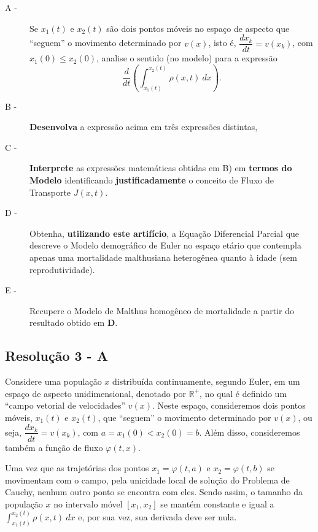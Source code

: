\begin{description}
\item[A -] Se $x_1(t)$ e $x_2(t)$ são dois pontos móveis no espaço de aspecto que ``seguem'' o movimento determinado por $v(x)$, isto é, $\dfrac{dx_k}{dt} = v(x_k)$, com \(x_1(0) \le x_2(0)\), analise o sentido (no modelo) para a expressão
\[\dfrac{d}{dt}\left(\displaystyle\int_{x_1(t)}^{x_2(t)} \rho(x,t)\ dx\right).\]

\item[B -] \textbf{Desenvolva} a expressão acima em três expressões distintas,

\item[C -] \textbf{Interprete} as expressões matemáticas obtidas em B) em \textbf{termos do Modelo} identificando \textbf{justificadamente} o conceito de Fluxo de Transporte \(J(x,t)\).

\item[D -] Obtenha, \textbf{utilizando este artifício}, a Equação Diferencial Parcial que descreve o Modelo demográfico de Euler no espaço etário que contempla apenas uma mortalidade malthusiana heterogênea quanto à idade (sem reprodutividade).

\item[E -] Recupere o Modelo de Malthus homogêneo de mortalidade a partir do resultado obtido em \textbf{D}.
\end{description}


\clearpage

\subsection*{\blue Resolução 3 - \textbf{A}}

Considere uma população $x$ distribuída continuamente, segundo Euler, em um espaço de aspecto unidimensional, denotado por \(\mathbb{R}^+\), no qual é definido um ``campo vetorial de velocidades'' $v(x)$. Neste espaço, consideremos dois pontos móveis, $x_1(t)$ e $x_2(t)$, que ``seguem'' o movimento determinado por $v(x)$, ou seja, $\dfrac{dx_k}{dt} = v(x_k)$, com $a = x_1(0) < x_2(0) = b$. Além disso, consideremos também a função de fluxo $\varphi (t, x)$.

Uma vez que as trajetórias dos pontos \(x_1 = \varphi(t, a)\) e \(x_2 = \varphi(t, b)\) se movimentam com o campo, pela unicidade local de solução do Problema de Cauchy, nenhum outro ponto se encontra com eles. Sendo assim, o tamanho da população $x$ no intervalo móvel \([x_1, x_2]\) se mantém constante e igual a \(\displaystyle\int_{x_1(t)}^{x_2(t)} \rho(x,t)\ dx\) e, por sua vez, sua derivada deve ser nula.


